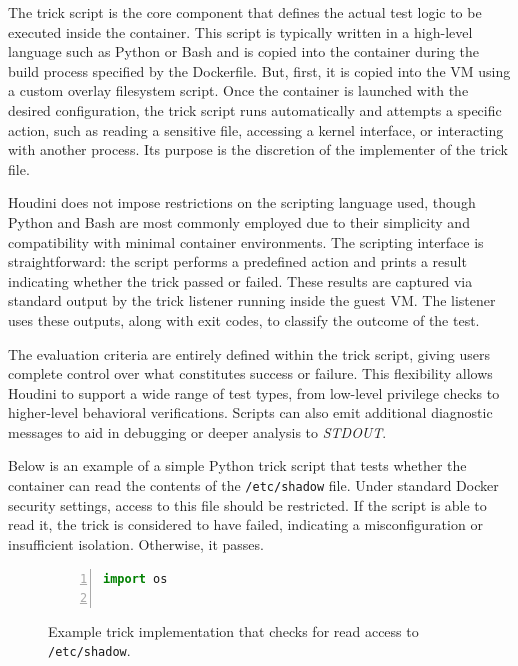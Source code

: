 \documentclass[12pt]{report}
\begin{document}
\begin{doublespace}
The trick script is the core component that defines the actual test logic to be executed inside the container. This script is typically written in a high-level language such as Python or Bash and is copied into the container during the build process specified by the Dockerfile. But, first, it is copied into the VM using a custom overlay filesystem script. Once the container is launched with the desired configuration, the trick script runs automatically and attempts a specific action, such as reading a sensitive file, accessing a kernel interface, or interacting with another process. Its purpose is the discretion of the implementer of the trick file.

Houdini does not impose restrictions on the scripting language used, though Python and Bash are most commonly employed due to their simplicity and compatibility with minimal container environments. The scripting interface is straightforward: the script performs a predefined action and prints a result indicating whether the trick passed or failed. These results are captured via standard output by the trick listener running inside the guest VM. The listener uses these outputs, along with exit codes, to classify the outcome of the test.

The evaluation criteria are entirely defined within the trick script, giving users complete control over what constitutes success or failure. This flexibility allows Houdini to support a wide range of test types, from low-level privilege checks to higher-level behavioral verifications. Scripts can also emit additional diagnostic messages to aid in debugging or deeper analysis to \textit{STDOUT}.

Below is an example of a simple Python trick script that tests whether the container can read the contents of the \texttt{/etc/shadow} file. Under standard Docker security settings, access to this file should be restricted. If the script is able to read it, the trick is considered to have failed, indicating a misconfiguration or insufficient isolation. Otherwise, it passes.

\begin{figure}[H]
\caption{Example trick implementation that checks for read access to \texttt{/etc/shadow}.}
\label{fig:trick-script}
\begin{lstlisting}[language=Python, numbers=left, numberstyle=\tiny, stepnumber=1, breaklines=true, frame=single, backgroundcolor=\color{gray!10}, basicstyle=\ttfamily\scriptsize, showspaces=false, showstringspaces=false]
import os


\end{lstlisting}
\end{figure}
\end{doublespace}
\end{document}
